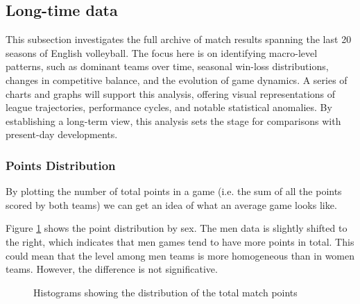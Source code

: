 \subsection{Long-time data}
\label{sub:long-range}


This subsection investigates the full archive of match results spanning the last 20 seasons of English volleyball. The focus here is on identifying macro-level patterns, such as dominant teams over time, seasonal win-loss distributions, changes in competitive balance, and the evolution of game dynamics. A series of charts and graphs will support this analysis, offering visual representations of league trajectories, performance cycles, and notable statistical anomalies. By establishing a long-term view, this analysis sets the stage for comparisons with present-day developments.

\subsubsection{Points Distribution}
By plotting the number of total points in a game (i.e. the sum of all the points scored by both teams) we can get an idea of what an average game looks like.

Figure \ref{fig:point-histogram} shows the point distribution by sex. The men data is slightly shifted to the right, which indicates that men games tend to have more points in total. This could mean that the level among men teams is more homogeneous than in women teams. However, the difference is not significative.

\begin{figure}
	\centering
	\qquad
	
	\caption{Histograms showing the distribution of the total match points}
	\label{fig:point-histogram}
\end{figure}


